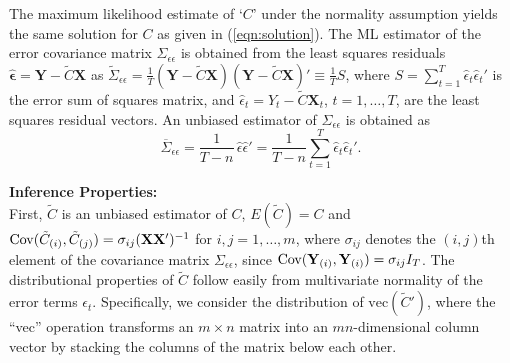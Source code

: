 The maximum likelihood estimate of `$C$' under the normality assumption yields the same solution for $C$ as given in (\ref{eqn:solution}). The ML estimator of the error covariance matrix $\Sigma_{\epsilon\epsilon}$ is obtained from the least squares residuals $\hat{\mathbf{\epsilon}}=\mathbf{Y}- \tilde{C} \mathbf{X}$ as $\tilde{\Sigma}_{\epsilon\epsilon}= \frac{1}{T}(\mathbf{Y}-\tilde{C}\mathbf{X})(\mathbf{Y}-\tilde{C}\mathbf{X})' \equiv \frac{1}{T}S$, where $S= \sum_{t=1}^T \hat{\epsilon}_t \hat{\epsilon}_t'$ is the error sum of squares matrix, and $\hat{\epsilon}_t= Y_t - \tilde{C} \mathbf{X}_t$, $t=1,\ldots,T$, are the least squares residual vectors. An unbiased estimator of $\Sigma_{\epsilon\epsilon}$ is obtained as 
	\begin{equation}\label{eqn:5unbiased}
	\overline{\Sigma}_{\epsilon\epsilon} = \dfrac{1}{T-n} \,\hat{\epsilon} \hat{\epsilon}' = \dfrac{1}{T-n} \sum_{t=1}^T \hat{\epsilon}_t \hat{\epsilon}_t'.
	\end{equation}


\noindent\textbf{Inference Properties:} \\


First, $\tilde{C}$ is an unbiased estimator of $C$, $E(\tilde{C})=C$ and $\operatorname{Cov}(\tilde{C}_{(i)}, \tilde{C}_{(j)})=\sigma_{ij}(\mathbf{X}\mathbf{X}')^{-1}$ for $i,j=1,\ldots,m$, where $\sigma_{ij}$ denotes the $(i,j)$th element of the covariance matrix $\Sigma_{\epsilon\epsilon}$, since $\operatorname{Cov}(\mathbf{Y}_{(i)}, \mathbf{Y}_{(i)})=\sigma_{ij} I_T$. The distributional properties of $\tilde{C}$ follow easily from multivariate normality of the error terms $\epsilon_t$. Specifically, we consider the distribution of $\text{vec}(\tilde{C}')$, where the ``vec'' operation transforms an $m \times n$ matrix into an $mn$-dimensional column vector by stacking the columns of the matrix below each other. 


